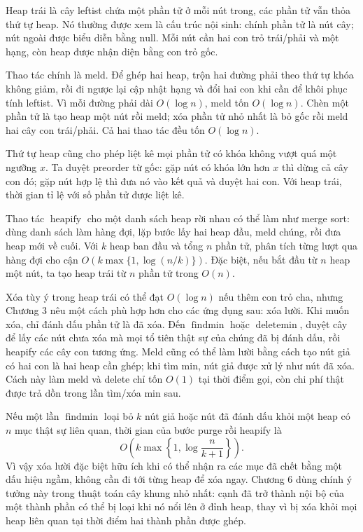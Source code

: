 \documentclass[11pt]{article}
\begin{document}
Heap trái là cây leftist chứa một phần tử ở mỗi nút trong, các phần tử vẫn thỏa
thứ tự heap. Nó thường được xem là cấu trúc nội sinh: chính phần tử là nút cây;
nút ngoài được biểu diễn bằng \(\text{null}\). Mỗi nút cần hai con trỏ trái/phải
và một hạng, còn heap được nhận diện bằng con trỏ gốc.

Thao tác chính là meld. Để ghép hai heap, trộn hai đường phải theo thứ tự khóa
không giảm, rồi đi ngược lại cập nhật hạng và đổi hai con khi cần để khôi phục
tính leftist. Vì mỗi đường phải dài \(O(\log n)\), meld tốn \(O(\log n)\). Chèn
một phần tử là tạo heap một nút rồi meld; xóa phần tử nhỏ nhất là bỏ gốc rồi
meld hai cây con trái/phải. Cả hai thao tác đều tốn \(O(\log n)\).

Thứ tự heap cũng cho phép liệt kê mọi phần tử có khóa không vượt quá một ngưỡng
\(x\). Ta duyệt preorder từ gốc: gặp nút có khóa lớn hơn \(x\) thì dừng cả cây
con đó; gặp nút hợp lệ thì đưa nó vào kết quả và duyệt hai con. Với heap trái,
thời gian tỉ lệ với số phần tử được liệt kê.

Thao tác \(\operatorname{heapify}\) cho một danh sách heap rời nhau có thể làm
như merge sort: dùng danh sách làm hàng đợi, lặp bước lấy hai heap đầu, meld
chúng, rồi đưa heap mới về cuối. Với \(k\) heap ban đầu và tổng \(n\) phần tử,
phân tích từng lượt qua hàng đợi cho cận \(O(k\max\{1,\log(n/k)\})\). Đặc biệt,
nếu bắt đầu từ \(n\) heap một nút, ta tạo heap trái từ \(n\) phần tử trong
\(O(n)\).

Xóa tùy ý trong heap trái có thể đạt \(O(\log n)\) nếu thêm con trỏ cha, nhưng
Chương 3 nêu một cách phù hợp hơn cho các ứng dụng sau: xóa lười. Khi muốn xóa,
chỉ đánh dấu phần tử là đã xóa. Đến \(\operatorname{findmin}\) hoặc
\(\operatorname{deletemin}\), duyệt cây để lấy các nút chưa xóa mà mọi tổ tiên
thật sự của chúng đã bị đánh dấu, rồi heapify các cây con tương ứng. Meld cũng
có thể làm lười bằng cách tạo nút giả có hai con là hai heap cần ghép; khi tìm
min, nút giả được xử lý như nút đã xóa. Cách này làm meld và delete chỉ tốn
\(O(1)\) tại thời điểm gọi, còn chi phí thật được trả dồn trong lần tìm/xóa min
sau.

Nếu một lần \(\operatorname{findmin}\) loại bỏ \(k\) nút giả hoặc nút đã đánh
dấu khỏi một heap có \(n\) mục thật sự liên quan, thời gian của bước purge rồi
heapify là
\[
  O\!\left(k\max\left\{1,\log\frac{n}{k+1}\right\}\right).
\]
Vì vậy xóa lười đặc biệt hữu ích khi có thể nhận ra các mục đã chết bằng một
dấu hiệu ngầm, không cần đi tới từng heap để xóa ngay. Chương 6 dùng chính ý
tưởng này trong thuật toán cây khung nhỏ nhất: cạnh đã trở thành nội bộ của
một thành phần có thể bị loại khi nó nổi lên ở đỉnh heap, thay vì bị xóa khỏi
mọi heap liên quan tại thời điểm hai thành phần được ghép.
\end{document}
